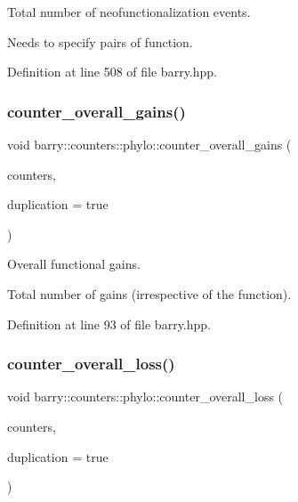 Total number of neofunctionalization events. 

Needs to specify pairs of function. 

Definition at line 508 of file barry.\+hpp.

\mbox{\label{namespacebarry_1_1counters_1_1phylo_ae1e599324d656660ce8730b77efcbcce}} 
\subsubsection{\texorpdfstring{counter\+\_\+overall\+\_\+gains()}{counter\_overall\_gains()}}
{\footnotesize\ttfamily void barry\+::counters\+::phylo\+::counter\+\_\+overall\+\_\+gains (\begin{DoxyParamCaption}\item[{\hyperlink{namespacebarry_1_1counters_1_1phylo_a4e401ffe66d04091343dcffaf915f8c3}{Phylo\+Counters} $\ast$}]{counters,  }\item[{bool}]{duplication = {\ttfamily true} }\end{DoxyParamCaption})\hspace{0.3cm}{\ttfamily [inline]}}



Overall functional gains. 

Total number of gains (irrespective of the function). 

Definition at line 93 of file barry.\+hpp.

\mbox{\label{namespacebarry_1_1counters_1_1phylo_a79ccde09af0d3d47b1a3162a16bc4597}} 
\subsubsection{\texorpdfstring{counter\+\_\+overall\+\_\+loss()}{counter\_overall\_loss()}}
{\footnotesize\ttfamily void barry\+::counters\+::phylo\+::counter\+\_\+overall\+\_\+loss (\begin{DoxyParamCaption}\item[{\hyperlink{namespacebarry_1_1counters_1_1phylo_a4e401ffe66d04091343dcffaf915f8c3}{Phylo\+Counters} $\ast$}]{counters,  }\item[{bool}]{duplication = {\ttfamily true} }\end{DoxyParamCaption})\hspace{0.3cm}{\ttfamily [inline]}}



